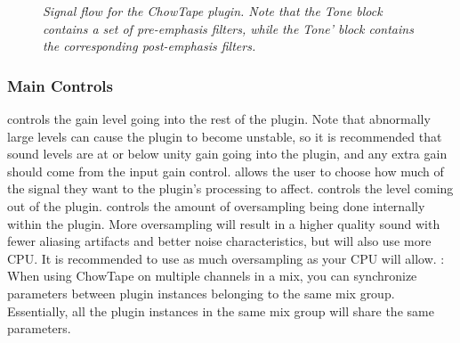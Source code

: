 \documentclass[landscape,twocolumn,a5paper]{manual}
\begin{document}
\begin{figure}
    \caption{\label{fig:tape_dsp}{\it Signal flow for the ChowTape plugin.
                                  Note that the Tone block contains a set
                                  of pre-emphasis filters, while the Tone'
                                  block contains the corresponding post-emphasis
                                  filters.}}
\end{figure}

\subsubsection{Main Controls}
 controls the gain level going into
the rest of the plugin. Note that abnormally large levels
can cause the plugin to become unstable, so it is recommended
that sound levels are at or below unity gain going into the
plugin, and any extra gain should come from the input gain
control.
\newpar
{} allows the user to choose how much of the
signal they want to the plugin's processing to affect.
\newpar
{} controls the level coming out of the plugin.
\newpar
{} controls the amount of oversampling
being done internally within the plugin. More oversampling
will result in a higher quality sound with fewer aliasing
artifacts and better noise characteristics, but will also
use more CPU. It is recommended to use as much oversampling
as your CPU will allow.
\newpar
{}: When using ChowTape on multiple channels
in a mix, you can synchronize parameters between plugin
instances belonging to the same mix group. Essentially, all
the plugin instances in the same mix group will share the same
parameters.
\end{document}
